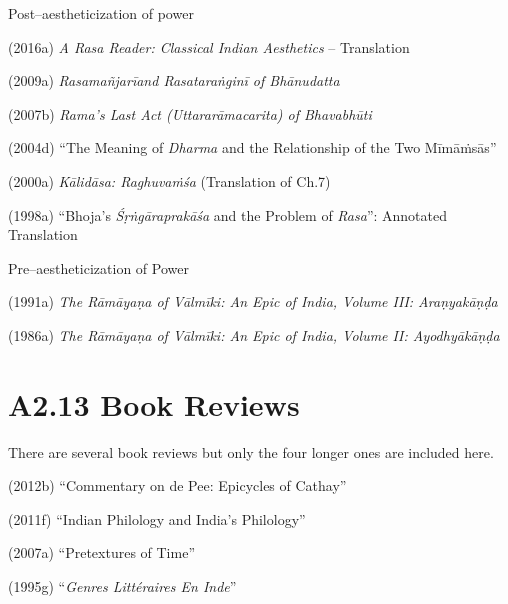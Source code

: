 Post–aestheticization of power

(2016a) \textit{A Rasa Reader: Classical Indian Aesthetics} – Translation

(2009a) \textit{Rasamañjarīand Rasataraṅginī of Bhānudatta}

(2007b) \textit{Rama's Last Act (Uttararāmacarita) of Bhavabhūti}

(2004d) “The Meaning of \textit{Dharma} and the Relationship of the Two Mīmāṁsās”

(2000a) \textit{Kālidāsa: Raghuvaṁśa} (Translation of Ch.7)

(1998a) “Bhoja's \textit{Śṛṅgāraprakāśa} and the Problem of \textit{Rasa}”: Annotated Translation

Pre–aestheticization of Power

(1991a) \textit{The Rāmāyaṇa of Vālmīki: An Epic of India, Volume III: Araṇyakāṇḍa}

(1986a) \textit{The Rāmāyaṇa of Vālmīki: An Epic of India, Volume II: Ayodhyākāṇḍa }

\vspace{-.5cm}

\section*{A2.13 Book Reviews}

There are several book reviews but only the four longer ones are included here.

(2012b) “Commentary on de Pee: Epicycles of Cathay”

(2011f) “Indian Philology and India’s Philology”

(2007a) “Pretextures of Time”

(1995g) “\textit{Genres Littéraires En Inde}”

